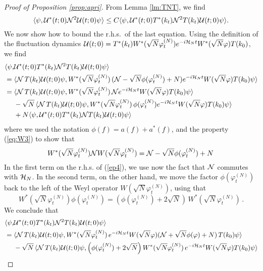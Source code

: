 \documentclass[11pt,a4paper]{article}
\newcommand{\cU}{{\cal U}}
\newcommand{\cH}{{\cal H}}
\newcommand{\cN}{{\cal N}}
\newcommand{\N}{\mathcal{N}}
\begin{document}
\begin{proof}[Proof of Proposition \ref{prop:apri}]
{F}rom Lemma \ref{lm:TNT}, we find
\begin{equation}\label{ep4-0}   \langle \psi , \cU^* (t;0) \cN^2 \cU (t;0) \psi \rangle \leq C  \langle \psi , \cU^* (t;0) T^* (k_t) \cN^2 T (k_t) \cU (t;0) \psi \rangle. \end{equation}
We now show how to bound the r.h.s.\ of the last equation. Using the definition of the fluctuation dynamics $\cU (t;0) = T^* (k_t) W^* (\sqrt{N} \varphi_t^{(N)}) e^{-i\cH_N t} W^* (\sqrt{N} \varphi) T (k_0)$, we find 
\begin{equation}\label{ep4}
\begin{split}
\langle \psi, &\cU^* (t;0) T^* (k_t) \N^2 T (k_t) \cU (t;0) \psi \rangle 
     \\  = \; & \langle \cN \, T (k_t) \cU (t;0) \psi,  W^* (\sqrt{N} \varphi_t^{(N)}) \, (\cN - \sqrt{N} \phi (\varphi_t^{(N)}) + N) e^{-i\cH_N t}  W (\sqrt{N} \varphi) T (k_0) \psi \rangle \\
      = \; & \langle \cN \, T (k_t) \cU (t;0) \psi,  W^* (\sqrt{N} \varphi_t^{(N)}) \,  \cN e^{-i \cH_N t}
      W (\sqrt{N} \varphi) T (k_0) \psi \rangle \\ & - \sqrt{N} \, \langle \cN \, T (k_t) \cU (t;0) \psi,  W^* (\sqrt{N} \varphi_t^{(N)} )\, \phi (\varphi_t^{(N)}) e^{-i \cH_N t}  W (\sqrt{N} \varphi) T (k_0) \psi \rangle \\
      &+  N  \langle \psi,\cU^* (t;0) T^* (k_t) \cN T (k_t) \cU (t;0) \psi \rangle 
      \end{split} \end{equation}
where we used the notation $\phi (f) = a( f) + a^* (f)$, and the property (\ref{eq:W3}) to show that 
\[ W^* (\sqrt{N} \varphi_t^{(N)}) \cN W (\sqrt{N} \varphi_t^{(N)}) = \cN - \sqrt{N} \phi (\varphi_t^{(N)})  +N \,  \]      
In the first term on the r.h.s. of (\ref{ep4}), we use now the fact that $\cN$ commutes with $\cH_N$. In the second term, on the other hand, we move the factor $\phi (\varphi_t^{(N)})$ back to the left of the Weyl operator $W (\sqrt{N} \varphi_t^{(N)})$, using that \[ W^* (\sqrt{N} \varphi_t^{(N)}) \phi (\varphi_t^{(N)}) = \left(\phi (\varphi_t^{(N)}) + 2 \sqrt{N} \right) \, W^* (\sqrt{N} \varphi_t^{(N)})\,. \] We conclude that
\begin{equation}\begin{split}
\langle \psi , &\cU^* (t;0) T^* (k_t) \cN^2 T(k_t) \cU (t;0) \psi \rangle \\ = \; & \langle \cN \, T (k_t) \cU (t;0) \psi,  W^* (\sqrt{N} \varphi_t^{(N)}) \,  e^{-i \cH_N t} W (\sqrt{N} \varphi) (\cN + \sqrt{N} \phi (\varphi) + N) \, T (k_0) \psi \rangle \\ &-  \sqrt{N} \, \langle \cN \, T (k_t) \cU (t;0) \psi,  \left(\phi (\varphi_t^{(N)}) + 2\sqrt{N} \right)  W^* (\sqrt{N} \varphi_t^{(N)}) \, e^{-i \cH_N t}  W (\sqrt{N} \varphi) T (k_0) \psi \rangle \\

\end{split}
\end{equation}
\end{proof}
\end{document}
